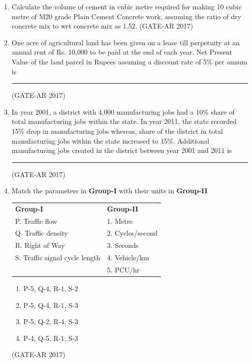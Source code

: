 \documentclass[a4paper,10pt]{article}
\begin{document}
\begin{enumerate}
    \item Calculate the volume of cement in cubic metre required for making 10 cubic metre of M20 grade Plain Cement Concrete work, assuming the ratio of dry concrete mix to wet concrete mix as 1.52. 
    \hfill (GATE-AR 2017)

    \item One acre of agricultural land has been given on a lease till perpetuity at an annual rent of Rs. 10,000 to be paid at the end of each year. Net Present Value of the land parcel in Rupees assuming a discount rate of 5\% per annum is \rule{2cm}{0.4pt}
    \hfill (GATE-AR 2017)

    \item In year 2001, a district with 4,000 manufacturing jobs had a 10\% share of total manufacturing jobs within the state. In year 2011, the state recorded 15\% drop in manufacturing jobs whereas, share of the district in total manufacturing jobs within the state increased to 15\%. Additional manufacturing jobs created in the district between year 2001 and 2011 is \rule{2cm}{0.4pt}
    \hfill (GATE-AR 2017)

    \item Match the parameters in \textbf{Group-I} with their units in \textbf{Group-II} \\
    \begin{tabular}{ l l }
	\textbf{Group-I} & \textbf{Group-II} \\
	P. Traffic flow & 1. Metre \\
	Q. Traffic density & 2. Cycles/second \\
	R. Right of Way & 3. Seconds \\
	S. Traffic signal cycle length & 4. Vehicle/km \\
	& 5. PCU/hr \\
	\end{tabular}
	\begin{multicols}{2}
	\begin{enumerate}
        \item P-5, Q-4, R-1, S-2
        \item P-5, Q-4, R-1, S-3
        \item P-5, Q-2, R-4, S-3
        \item P-4, Q-5, R-1, S-3
    \end{enumerate}
	\end{multicols}
    \hfill (GATE-AR 2017)


\end{enumerate}
\end{document}
